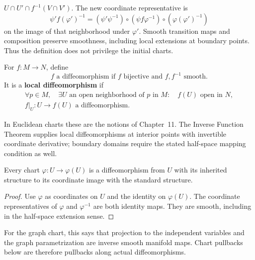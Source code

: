 $U\cap U'\cap f^{-1}(V\cap V')$. The new coordinate representative is
\[
\psi'f(\varphi')^{-1}
=(\psi'\psi^{-1})\circ(\psi f\varphi^{-1})\circ(\varphi(\varphi')^{-1})
\]
on the image of that neighborhood under $\varphi'$. Smooth transition maps
and composition preserve smoothness, including local extensions at boundary
points. Thus the definition does not privilege the initial charts.
\begin{definition}
For $f:M\to N$, define
\[
f\text{ a diffeomorphism}\text{ if } f\text{ bijective and }f,f^{-1}\text{ smooth}.
\]
It is a \textbf{local diffeomorphism} if
\[
\begin{gathered}
\forall p\in M,\quad\exists U\text{ an open neighborhood of }p\text{ in }M:\quad f(U)\text{ open in }N,\\
f|_U:U\longrightarrow f(U)\text{ a diffeomorphism}.
\end{gathered}
\]
\end{definition}
In Euclidean charts these are the notions of Chapter~11. The Inverse
Function Theorem supplies local diffeomorphisms at interior points with
invertible coordinate derivative; boundary domains require the stated
half-space mapping condition as well.

\begin{proposition}\label{prop:chart-diffeomorphism}
Every chart $\varphi:U\to\varphi(U)$ is a diffeomorphism from $U$ with
its inherited structure to its coordinate image with the standard structure.
\end{proposition}
\begin{proof}
Use $\varphi$ as coordinates on $U$ and the identity on $\varphi(U)$.
The coordinate representatives of $\varphi$ and $\varphi^{-1}$ are both
identity maps. They are smooth, including in the half-space extension sense.
\end{proof}
For the graph chart, this says that projection to the independent variables
and the graph parametrization are inverse smooth manifold maps. Chart
pullbacks below are therefore pullbacks along actual diffeomorphisms.

